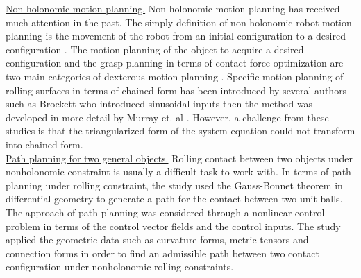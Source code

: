 \noindent\uline{Non-holonomic motion planning.} Non-holonomic motion planning has received much attention in the past. The simply definition of non-holonomic robot motion planning is the movement of the robot from an initial configuration to a desired configuration  \cite{Z.Li89_MotionPlanning_Nonholonomic, Z.Li91_NonholonomicMotionPlanning, Murray93_NonholonomicMP}. 
The motion planning of the object to acquire a desired configuration and the grasp planning in terms of contact force optimization are two main categories of dexterous motion planning \cite{Okamura_2000_Overview_DM}. 
Specific motion planning of rolling surfaces in terms of chained-form has been introduced by several authors such as Brockett \cite{Brockett82_ControlTheory_RiemannianGeo} who introduced sinusoidal inputs then the method was developed in more detail by Murray et. al \cite{Murray-Li_EbookRobotic_Manipulation}. 
However, a challenge from these studies is that the triangularized form of the system equation could not transform into chained-form.\\



\noindent\uline{Path planning for two general objects.}
Rolling contact between two objects under nonholonomic constraint is usually a difficult task to work with. In terms of path planning under rolling constraint, the study \cite{Z.Li90_MotionRigidBody_RC} used the Gauss-Bonnet theorem in differential geometry to generate a path for the contact between two unit balls. The approach of path planning was considered through a nonlinear control problem in terms of the control vector fields and the control inputs. The study applied the geometric data such as curvature forms, metric tensors and connection forms in order to find an admissible path between two contact configuration under nonholonomic rolling constraints.\\

